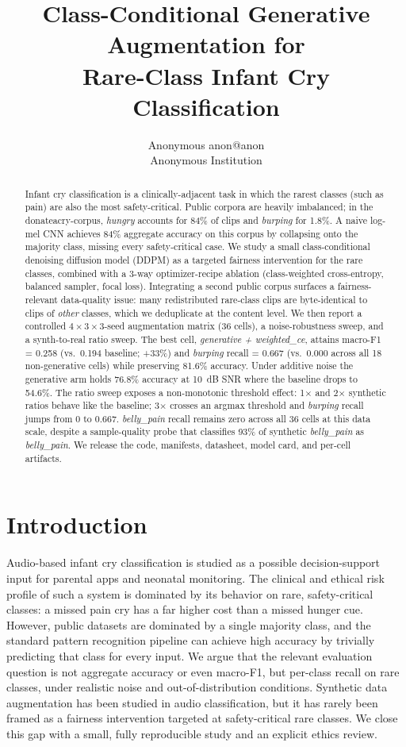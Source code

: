 \documentclass[10pt]{article}
\title{Class-Conditional Generative Augmentation for\\Rare-Class Infant Cry Classification}
\author{\name Anonymous \email anon@anon \\ \addr Anonymous Institution}
\begin{document}
\maketitle

\begin{abstract}
Infant cry classification is a clinically-adjacent task in which the rarest classes (such as pain) are also the most safety-critical. Public corpora are heavily imbalanced; in the donateacry-corpus, \textit{hungry} accounts for 84\% of clips and \textit{burping} for 1.8\%. A naive log-mel CNN achieves 84\% aggregate accuracy on this corpus by collapsing onto the majority class, missing every safety-critical case. We study a small class-conditional denoising diffusion model (DDPM) as a targeted fairness intervention for the rare classes, combined with a 3-way optimizer-recipe ablation (class-weighted cross-entropy, balanced sampler, focal loss). Integrating a second public corpus surfaces a fairness-relevant data-quality issue: many redistributed rare-class clips are byte-identical to clips of \emph{other} classes, which we deduplicate at the content level. We then report a controlled $4 \times 3 \times 3$-seed augmentation matrix (36 cells), a noise-robustness sweep, and a synth-to-real ratio sweep. The best cell, \textit{generative + weighted\_ce}, attains macro-F1 = 0.258 (vs.\ 0.194 baseline; +33\%) and \textit{burping} recall = 0.667 (vs.\ 0.000 across all 18 non-generative cells) while preserving 81.6\% accuracy. Under additive noise the generative arm holds 76.8\% accuracy at 10~dB SNR where the baseline drops to 54.6\%. The ratio sweep exposes a non-monotonic threshold effect: 1$\times$ and 2$\times$ synthetic ratios behave like the baseline; 3$\times$ crosses an argmax threshold and \textit{burping} recall jumps from 0 to 0.667. \textit{belly\_pain} recall remains zero across all 36 cells at this data scale, despite a sample-quality probe that classifies 93\% of synthetic \textit{belly\_pain} as \textit{belly\_pain}. We release the code, manifests, datasheet, model card, and per-cell artifacts.
\end{abstract}

\section{Introduction}\label{sec:intro}
Audio-based infant cry classification is studied as a possible decision-support input for parental apps and neonatal monitoring. The clinical and ethical risk profile of such a system is dominated by its behavior on rare, safety-critical classes: a missed pain cry has a far higher cost than a missed hunger cue. However, public datasets are dominated by a single majority class, and the standard pattern recognition pipeline can achieve high accuracy by trivially predicting that class for every input. We argue that the relevant evaluation question is not aggregate accuracy or even macro-F1, but per-class recall on rare classes, under realistic noise and out-of-distribution conditions. Synthetic data augmentation has been studied in audio classification, but it has rarely been framed as a fairness intervention targeted at safety-critical rare classes. We close this gap with a small, fully reproducible study and an explicit ethics review.
\end{document}
